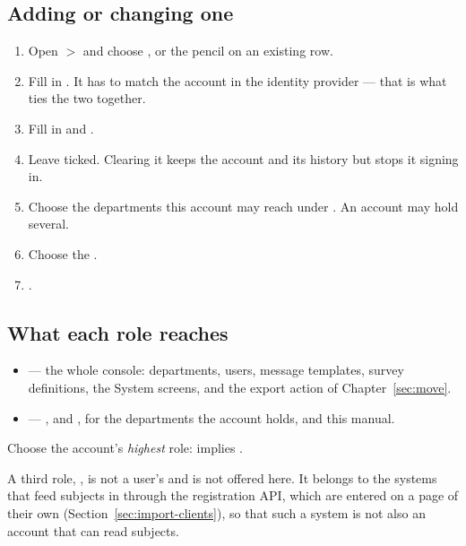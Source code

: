 \documentclass[11pt, a4paper]{article}
\begin{document}
\subsection{Adding or changing one}

\begin{enumerate}
  \item Open  $>$  and choose , or the pencil on an existing
        row.
  \item Fill in . It has to match the account in the identity provider — that is
        what ties the two together.
  \item Fill in  and .
  \item Leave  ticked. Clearing it keeps the account and its history but stops it
        signing in.
  \item Choose the departments this account may reach under . An account may
        hold several.
  \item Choose the .
  \item {}.
\end{enumerate}


\subsection{What each role reaches}

\begin{itemize}
  \item {} — the whole console: departments, users, message templates,
        survey definitions, the System screens, and the export action of Chapter~\ref{sec:move}.
  \item {} — ,  and
        , for the departments the account holds, and this manual.
\end{itemize}

Choose the account's \emph{highest} role:  implies .

A third role, , is not a user's and is not offered here. It belongs to
the systems that feed subjects in through the registration API, which are entered on a page of
their own (Section~\ref{sec:import-clients}), so that such a system is not also an account that
can read subjects.
\end{document}
